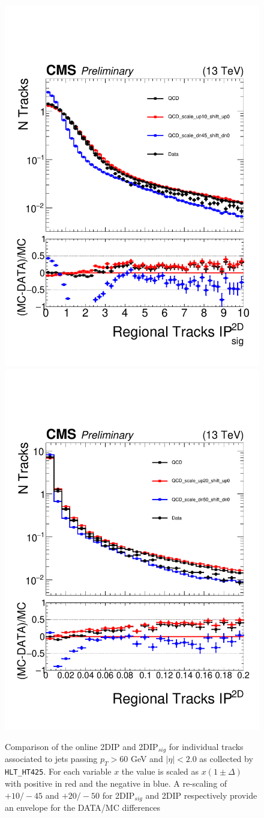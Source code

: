 \begin{figure}
\begin{center}
\includegraphics[width=.45\textwidth]{figures/an/SYSTEMATICS/REGIONAL_SYSTEMATIC/2dipsig_regional_systematic.pdf}
\includegraphics[width=.45\textwidth]{figures/an/SYSTEMATICS/REGIONAL_SYSTEMATIC/2dip_regional_systematic.pdf}
\caption{Comparison of the online 2DIP and 2DIP$_{sig}$ for individual tracks associated to jets passing $p_{T} > 60$ GeV and $|\eta| <2.0$ as collected by  \texttt{HLT\_HT425}. For each variable $x$ the value is scaled as $x(1\pm\Delta)$ with positive in red and the negative in blue. A re-scaling of $+10/-45$ and $+20/-50$ for
2DIP$_{sig}$ and 2DIP respectively provide an envelope for the DATA/MC differences  \label{fig:regional_modeling}}
\end{center}
\end{figure}



